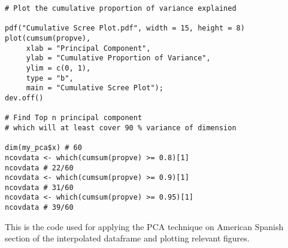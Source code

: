 \begin{verbatim}
# Plot the cumulative proportion of variance explained

pdf("Cumulative Scree Plot.pdf", width = 15, height = 8) 
plot(cumsum(propve),
     xlab = "Principal Component",
     ylab = "Cumulative Proportion of Variance",
     ylim = c(0, 1), 
     type = "b",
     main = "Cumulative Scree Plot");
dev.off()

# Find Top n principal component
# which will at least cover 90 % variance of dimension

dim(my_pca$x) # 60
ncovdata <- which(cumsum(propve) >= 0.8)[1] 
ncovdata # 22/60
ncovdata <- which(cumsum(propve) >= 0.9)[1] 
ncovdata # 31/60
ncovdata <- which(cumsum(propve) >= 0.95)[1] 
ncovdata # 39/60
\end{verbatim}

This is the code used for applying the PCA technique on American Spanish section of the interpolated dataframe and plotting relevant figures.
